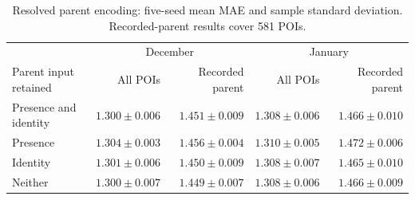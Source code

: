 \begin{table}[!htbp]
\centering\small
\caption{Resolved parent encoding: five-seed mean MAE and sample standard deviation. Recorded-parent results cover 581 POIs.}
\label{tab:resolved_parent}
\begin{tabular}{lrrrr}
\toprule
 & \multicolumn{2}{c}{December} & \multicolumn{2}{c}{January} \\
Parent input retained & All POIs & Recorded parent & All POIs & Recorded parent \\
\midrule
Presence and identity & $1.300\pm 0.006$ & $1.451\pm 0.009$ & $1.308\pm 0.006$ & $1.466\pm 0.010$ \\
Presence & $1.304\pm 0.003$ & $1.456\pm 0.004$ & $1.310\pm 0.005$ & $1.472\pm 0.006$ \\
Identity & $1.301\pm 0.006$ & $1.450\pm 0.009$ & $1.308\pm 0.007$ & $1.465\pm 0.010$ \\
Neither & $1.300\pm 0.007$ & $1.449\pm 0.007$ & $1.308\pm 0.006$ & $1.466\pm 0.009$ \\
\bottomrule
\end{tabular}
\end{table}
